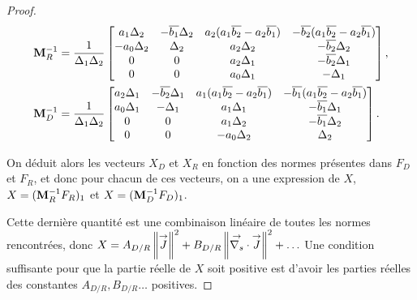 \begin{proof}
    \begin{align*}
      \mathbf{M}_R^{-1} & =\dfrac{1}{\Delta_1\Delta_2}
      \begin{bmatrix}
        a_1 \Delta_2 & -{\overline{b_1}}\Delta_2 & a_2(a_1{\overline{b_2}}-a_2{\overline{b_1}}) & -{\overline{b_2}}(a_1{\overline{b_2}}-a_2{\overline{b_1}})
        \\
        -a_0 \Delta_2 & \Delta_2 & a_2\Delta_2 & -{\overline{b_2}}\Delta_2
        \\
        0 & 0 & a_2\Delta_1 & -{\overline{b_2}}\Delta_1
        \\
        0 & 0 & a_0\Delta_1 & -\Delta_1
      \end{bmatrix},
      \\
      \mathbf{M}_D^{-1} & =\dfrac{1}{\Delta_1\Delta_2}
      \begin{bmatrix}
        a_2 \Delta_1 & -{\overline{b_2}}\Delta_1 & a_1(a_1{\overline{b_2}}-a_2{\overline{b_1}}) & -{\overline{b_1}}(a_1{\overline{b_2}}-a_2{\overline{b_1}})
        \\
        a_0 \Delta_1 & -\Delta_1 & a_1\Delta_1 & -{\overline{b_1}}\Delta_1
        \\
        0 & 0 & a_1\Delta_2 & -{\overline{b_1}}\Delta_2
        \\
        0 & 0 & -a_0\Delta_2 & \Delta_2
      \end{bmatrix}.
    \end{align*}
    
    On déduit alors les vecteurs \(X_D\) et \(X_R\) en fonction des normes présentes dans \(F_D\) et \(F_R\), et donc pour chacun de ces vecteurs, on a une expression de \(X\), \(X = (\mathbf{M}_R^{-1}F_R)_1\) et \(X = (\mathbf{M}_D^{-1}F_D)_1\).

    Cette dernière quantité est une combinaison linéaire de toutes les normes rencontrées, donc \(X = A_{D/R} \left\lVert{\overset{\rightarrow}{J}}\right\rVert^2 + B_{D/R} \left\lVert{\overset{\rightarrow}{\nabla_s}} \cdot {\overset{\rightarrow}{J}}\right\rVert^2 + \ldots \)
    Une condition suffisante pour que la partie réelle de \(X\) soit positive est d'avoir les parties réelles des constantes \(A_{D/R},B_{D/R} \ldots\) positives.


\end{proof}
